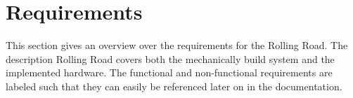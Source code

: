 \chapter{Requirements}
This section gives an overview over the requirements for the Rolling Road. The description Rolling Road covers both the mechanically build system and the implemented hardware. The functional and non-functional requirements are labeled such that they can easily be referenced later on in the documentation.


